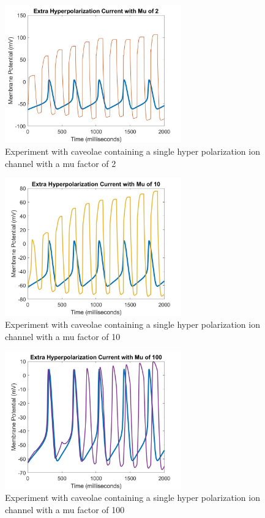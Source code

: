 \documentclass{bmcart}%
\begin{document}

\begin{figure}[ht]
  \centering
  \includegraphics[width=3in]{images/hMu2}
  \caption[hMu2]
  {Experiment with caveolae containing a single hyper polarization ion\\
  channel with a mu factor of 2}
\label{fig:hMu2}
\end{figure}

\begin{figure}[ht]
  \centering
  \includegraphics[width=3in]{images/hMu10}
  \caption[hMu10]
  {Experiment with caveolae containing a single hyper polarization ion\\
  channel with a mu factor of 10}
\label{fig:hMu10}
\end{figure}

\begin{figure}[ht]
  \centering
  \includegraphics[width=3in]{images/hMu100}
  \caption[hMu100]
  {Experiment with caveolae containing a single hyper polarization ion\\
  channel with a mu factor of 100}
\label{fig:hMu100}
\end{figure}
\end{document}
